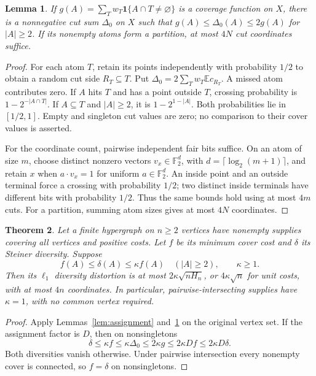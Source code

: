 \documentclass[11pt]{article}
\newtheorem{theorem}{Theorem}
\newtheorem{lemma}[theorem]{Lemma}
\newcommand{\F}{\mathbb F}
\newcommand{\E}{\mathbb E}
\newcommand{\ind}{\mathbf 1}
\begin{document}
\begin{lemma}\label{lem:lift}
If $g(A)=\sum_Tw_T\ind\{A\cap T\ne\varnothing\}$ is a coverage function on
$X$, there is a nonnegative cut sum $\Delta_0$ on $X$ such that
$g(A)\le\Delta_0(A)\le2g(A)$ for $|A|\ge2$.
If its nonempty atoms form a partition, at most $4N$ cut coordinates suffice.
\end{lemma}
\begin{proof}
For each atom $T$, retain its points independently with probability $1/2$
to obtain a random cut side $R_T\subseteq T$. Put
$\Delta_0=2\sum_Tw_T\E c_{R_T}$.
A missed atom contributes zero. If $A$ hits $T$ and has a point outside $T$,
crossing probability is $1-2^{-|A\cap T|}$. If $A\subseteq T$ and $|A|\ge2$,
it is $1-2^{1-|A|}$. Both probabilities lie in $[1/2,1]$.
Empty and singleton cut values are zero; no comparison to their cover
values is asserted.

For the coordinate count, pairwise independent fair bits suffice. On an
atom of size $m$, choose distinct nonzero vectors $v_x\in\F_2^d$, with
$d=\lceil\log_2(m+1)\rceil$, and retain $x$ when $a\cdot v_x=1$ for uniform
$a\in\F_2^d$. An inside point and an outside terminal force a crossing
with probability $1/2$; two distinct inside terminals have different bits
with probability $1/2$. Thus the same bounds hold using at most $4m$ cuts.
For a partition, summing atom sizes gives at most $4N$ coordinates.
\end{proof}

\begin{theorem}\label{thm:upper}
Let a finite hypergraph on $n\ge2$ vertices have nonempty supplies covering
all vertices and positive costs. Let $f$ be its minimum cover cost and
$\delta$ its Steiner diversity. Suppose
\[
 f(A)\le\delta(A)\le\kappa f(A)\quad(|A|\ge2),\qquad\kappa\ge1.
\]
Then its $\ell_1$ diversity distortion is at most $2\kappa\sqrt{nH_n}$,
or $4\kappa\sqrt n$ for unit costs, with at most $4n$ coordinates.
In particular, pairwise-intersecting supplies have $\kappa=1$, with no
common vertex required.
\end{theorem}
\begin{proof}
Apply Lemmas~\ref{lem:assignment} and~\ref{lem:lift} on the original vertex
set. If the assignment factor is $D$, then on nonsingletons
\[
 \delta\le\kappa f\le\kappa\Delta_0
 \le2\kappa g\le2\kappa Df\le2\kappa D\delta.
\]
Both diversities vanish otherwise. Under pairwise intersection every
nonempty cover is connected, so $f=\delta$ on nonsingletons.
\end{proof}
\end{document}
